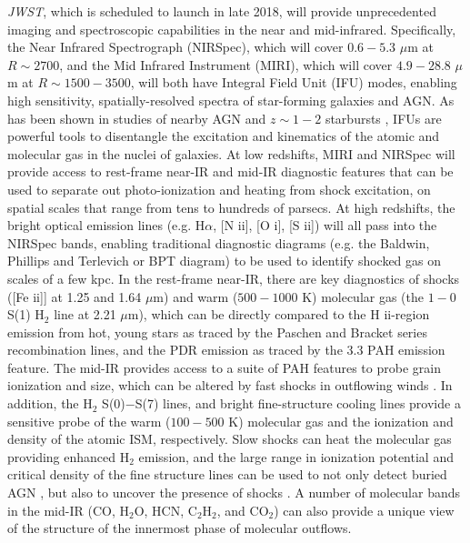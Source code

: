 \documentclass{pasa}%
\begin{document}
{\it JWST}, which is scheduled to launch in late 2018, will provide
unprecedented imaging and spectroscopic capabilities in the near and
mid-infrared.  Specifically, the Near Infrared Spectrograph (NIRSpec), which 
will cover $0.6-5.3$ $\mu$m at $R\sim2700$, and the Mid
Infrared Instrument (MIRI), which will cover $4.9-28.8$ $\mu$m at
$R\sim1500-3500$, will both have Integral Field Unit (IFU) modes, enabling
high sensitivity, spatially-resolved spectra of star-forming galaxies and AGN.
As has been shown in studies of nearby AGN
\citep[e.g.,][]{mul16,rif16} and $z\sim1-2$ starbursts 
\citep[e.g.,][]{gen14,liv15,mie16},
IFUs are powerful tools to disentangle the excitation and kinematics of the
atomic and molecular gas in the nuclei of galaxies. 
At low redshifts, MIRI and NIRSpec will provide access to rest-frame near-IR
and mid-IR diagnostic features that can be used to separate out
photo-ionization and heating from shock excitation, on spatial scales that
range from tens to hundreds of parsecs.  
At high redshifts, the bright optical emission lines 
(e.g. H$\alpha$, [N {\sc ii}], [O {\sc i}], [S {\sc ii}]) will 
all pass into the NIRSpec bands, enabling traditional diagnostic diagrams
(e.g. the Baldwin, Phillips and Terlevich or BPT diagram) to be used to
identify shocked gas on scales of a few kpc. In the rest-frame near-IR, 
there are key diagnostics of shocks ([Fe {\sc ii}]] at 1.25 and 1.64 $\mu$m) 
and warm ($500-1000$ K) molecular gas (the $1-0$ S(1) H$_2$ line at 2.21
$\mu$m), which can be directly compared to the H {\sc ii}-region emission 
from hot, young stars as traced by the Paschen and Bracket series
recombination lines, and the PDR emission as traced by the 3.3
PAH emission feature. The mid-IR provides access to a suite of PAH
features %
to probe grain ionization and size, which can be altered by fast shocks in
outflowing winds \citep[e.g.,][]{bei15}. In addition, 
the H$_2$ S(0)$-$S(7) lines, and bright fine-structure cooling lines 
provide a sensitive probe of the warm
($100-500$ K) molecular gas and the ionization and density of the atomic ISM,
respectively.  Slow shocks can heat the molecular gas providing enhanced H$_2$
emission, and the large range in ionization potential and critical density 
of the fine structure lines can be used to not only detect buried AGN 
\citep[see][this issue]{spi17}, but also to uncover the presence of 
shocks \citep{all08,ina13}. A number of molecular
bands in the mid-IR (CO, H$_2$O, HCN, C$_2$H$_2$, and CO$_2$) can also provide
a unique view of the structure of the innermost phase of molecular outflows. 
\end{document}
